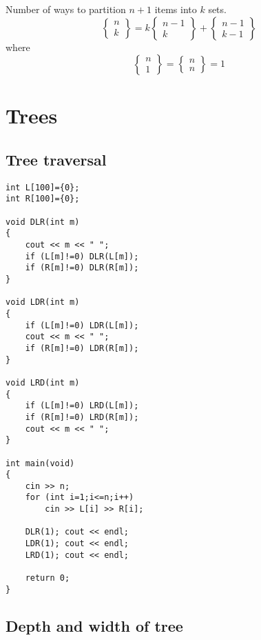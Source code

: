 \documentclass[a4paper]{article}
\begin{document}
Number of ways to partition $n+1$ items into $k$ sets.
\begin{equation}
\left\{\begin{matrix}n \\ k\end{matrix}\right\}=k\left\{\begin{matrix}
n-1 \\ k
\end{matrix}\right\}+\left\{\begin{matrix}
n-1 \\ k-1
\end{matrix}\right\}
\end{equation}
where
\begin{equation}
\left\{\begin{matrix}
n \\ 1
\end{matrix}\right\}=\left\{\begin{matrix}
n \\ n
\end{matrix}\right\}=1
\end{equation}

\section{Trees}

\subsection{Tree traversal}

\begin{verbatim}
int L[100]={0};
int R[100]={0};

void DLR(int m)
{
	cout << m << " ";
	if (L[m]!=0) DLR(L[m]);
	if (R[m]!=0) DLR(R[m]);
}

void LDR(int m)
{
	if (L[m]!=0) LDR(L[m]);
	cout << m << " ";
	if (R[m]!=0) LDR(R[m]);
}

void LRD(int m)
{
	if (L[m]!=0) LRD(L[m]);
	if (R[m]!=0) LRD(R[m]);
	cout << m << " ";
}

int main(void)
{
	cin >> n;
	for (int i=1;i<=n;i++)
		cin >> L[i] >> R[i];

	DLR(1); cout << endl;
	LDR(1); cout << endl;
	LRD(1); cout << endl;

	return 0;
}
\end{verbatim}

\subsection{Depth and width of tree}
\end{document}
